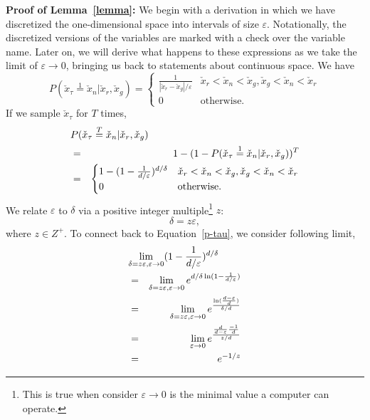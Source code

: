 \documentclass[letterpaper]{article} %
\begin{document}
\noindent \textbf{Proof of Lemma~\ref{lemma}:} We begin with a derivation in which we have discretized the one-dimensional space into intervals of size $\varepsilon$. Notationally, the discretized versions of the variables are marked with a check over the variable name. Later on, we will derive what happens to these expressions as we take the limit of $\varepsilon\rightarrow 0$, bringing us back to statements about continuous space. We have
\begin{equation}\label{p-epsilon-pr-pg}
    P(\check{x}_\tau\overset{1}{=}\check{x}_n|\check{x}_r,\check{x}_g)=
    \begin{cases}
        \frac{1}{|\check{x}_r-\check{x}_g|/\varepsilon} &\mbox{$\check{x}_r<\check{x}_n<\check{x}_g,\check{x}_g<\check{x}_n<\check{x}_r$}\\
        0 &\mbox{otherwise}.
    \end{cases}
\end{equation}
If we sample $\check{x}_\tau$ for $T$ times,
\begin{eqnarray}\label{p-tau}
\lefteqn{ P(\check{x}_\tau\overset{T}{=}\check{x}_n|\check{x}_r,\check{x}_g)}\\
    &=& 1 - (1-P(\check{x}_\tau\overset{1}{=}\check{x}_n|\check{x}_r,\check{x}_g))^T \nonumber\\
    &=&
    \begin{cases}
        1 - (1-\frac{1}{d/\varepsilon})^{d/\delta} &\mbox{$\check{x}_r<\check{x}_n<\check{x}_g,\check{x}_g<\check{x}_n<\check{x}_r$} \\
        0 &\mbox{otherwise}. \nonumber
    \end{cases}
\end{eqnarray}
We relate $\varepsilon$ to $\delta$ via a positive integer multiple\footnote{This is true when consider $\varepsilon \rightarrow 0$ is the minimal value a computer can operate.} $z$:
\begin{equation}\label{deltal-satisfy}
  \delta = z \varepsilon,
\end{equation}
where $z \in Z^{+}$.
To connect back to Equation~\eqref{p-tau}, we consider following limit,
\begin{eqnarray}\label{limit-constant}
\lefteqn{\lim_{\delta=z\varepsilon,\varepsilon\rightarrow 0} (1-\frac{1}{d/\varepsilon})^{d/\delta}} \nonumber\\
    \nonumber &=& \lim_{\delta=z\varepsilon,\varepsilon\rightarrow 0} e^{d/\delta \ln(1-\frac{1}{d/\varepsilon})} \\
    \nonumber &=& \lim_{\delta=z\varepsilon,\varepsilon\rightarrow 0} e^{\frac{\ln(\frac{d-\varepsilon}{d})}{\delta/d}} \\
    \nonumber &=& \lim_{\varepsilon\rightarrow0} e^{\frac{\frac{d}{d-\varepsilon}\frac{-1}{d}}{z/d}} \\
    &=& e^{-1/z} \label{e:e}
\end{eqnarray}
\end{document}
